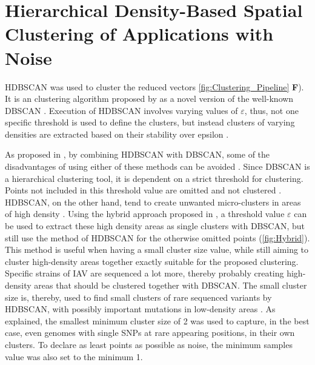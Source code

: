 \section{Hierarchical Density-Based Spatial Clustering of Applications with Noise} \label{sec:HDBSCAN}

\gls{HDBSCAN} was used to cluster the reduced vectors \autoref{fig:Clustering_Pipeline} \textsf{\textbf{F}}). It is an clustering algorithm proposed by \textcite{campello_hierarchical_2015} as a novel version of the well-known \gls{DBSCAN} \autocite{hutchison_density-based_2013}. Execution of \gls{HDBSCAN} involves varying values of $\varepsilon$, thus, not one specific threshold is used to define the clusters, but instead clusters of varying densities are extracted based on their stability over epsilon \autocite{mcinnes_hdbscan_2017}. 

As proposed in \textcite{malzer_hybrid_2020}, by combining \gls{HDBSCAN} with \gls{DBSCAN}, some of the disadvantages of using either of these methods can be avoided \autocite{mcinnes_hdbscan_2017, moulavi_density-based_2014}. Since \gls{DBSCAN} is a hierarchical clustering tool, it is dependent on a strict threshold for clustering. Points not included in this threshold value are omitted and not clustered \autocite{ester_density-based_1996, schubert_dbscan_2017}. \gls{HDBSCAN}, on the other hand, tend to create unwanted micro-clusters in areas of high density \autocite{mcinnes_hdbscan_2017}. Using the hybrid approach proposed in \autocite{malzer_hybrid_2020}, a threshold value $\varepsilon$ can be used to extract these high density areas as single clusters with \gls{DBSCAN}, but still use the method of \gls{HDBSCAN} for the otherwise omitted points (\autoref{fig:Hybrid}). This method is useful when having a small cluster size value, while still aiming to cluster high-density areas together exactly suitable for the proposed clustering. Specific strains of \gls{IAV} are sequenced a lot more, thereby probably creating high-density areas that should be clustered together with \gls{DBSCAN}. The small cluster size is, thereby, used to find small clusters of rare sequenced variants by \gls{HDBSCAN}, with possibly important mutations in low-density areas \autocite{malzer_hybrid_2020}. As explained, the smallest minimum cluster size of 2 was used to capture, in the best case, even genomes with single \glspl{SNP} at rare appearing positions, in their own clusters. To declare as least points as possible as noise, the minimum samples value was also set to the minimum 1. 

